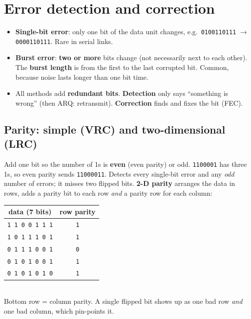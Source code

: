 \documentclass[10pt]{article}
\begin{document}
\section{Error detection and correction}

\begin{itemize}
\item \textbf{Single-bit error}: only one bit of the data unit changes, e.g.\ \texttt{0100110111} $\to$ \texttt{0\textcolor{hardc}{0}00110111}. Rare in serial links.
\item \textbf{Burst error}: \textbf{two or more} bits change (not necessarily next to each other). The \textbf{burst length} is from the first to the last corrupted bit. Common, because noise lasts longer than one bit time.
\item All methods add \textbf{redundant bits}. \textbf{Detection} only says ``something is wrong'' (then ARQ: retransmit). \textbf{Correction} finds and fixes the bit (FEC).
\end{itemize}

\subsection{Parity: simple (VRC) and two-dimensional (LRC)}
Add one bit so the number of 1s is \textbf{even} (even parity) or odd. \texttt{1100001} has three 1s, so even parity sends \texttt{1100001\textcolor{brand}{1}}.
Detects every single-bit error and any \emph{odd} number of errors; it misses two flipped bits.
\textbf{2-D parity} arranges the data in rows, adds a parity bit to each row \emph{and} a parity row for each column:

\begin{center}\small
\begin{tabular}{l|c}
\multicolumn{1}{c|}{\textbf{data (7 bits)}} & \textbf{row parity}\\\hline
\texttt{1 1 0 0 1 1 1} & \texttt{\textcolor{brand}{1}}\\
\texttt{1 0 1 1 1 0 1} & \texttt{\textcolor{brand}{1}}\\
\texttt{0 1 1 1 0 0 1} & \texttt{\textcolor{brand}{0}}\\
\texttt{0 1 0 1 0 0 1} & \texttt{\textcolor{brand}{1}}\\\hline
\rowcolor{cream}\texttt{\textcolor{brand}{0 1 0 1 0 1 0}} & \texttt{\textcolor{brand}{1}}
\end{tabular}\\[2pt]
{\scriptsize\color{midgrey}Bottom row = column parity. A single flipped bit shows up as one bad row \emph{and} one bad column, which pin-points it.}
\end{center}
\end{document}
